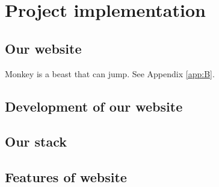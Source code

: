 \chapter{Project implementation    }\label{ch:C}
\section{Our website  }
Monkey is a beast that can jump. See Appendix \ref{app:B}.
\section{Development of our website }
\section{Our stack }
\section{ Features of website }